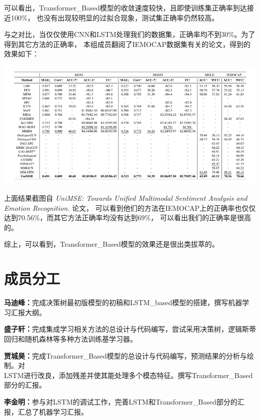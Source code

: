 \documentclass[11pt]{article}
\begin{document}
            可以看出，Transformer\_Based模型的收敛速度较快，且即使训练集正确率到达接近100\%，
            也没有出现较明显的过拟合现象，测试集正确率仍然较高。
            
            与之对比，当仅仅使用CNN和LSTM处理我们的数据集，正确率均不到30\%。为了得到其它方法的正确率，
            本组成员翻阅了IEMOCAP数据集有关的论文，得到的效果如下：

            \begin{center}
                \includegraphics[scale=0.9]{graph/result7.png}
            \end{center}

            上面结果截图自\textit{ UniMSE: Towards Unified Multimodal Sentiment Analysis and Emotion Recognition. }论文，
            可以看到他们的方法在IEMOCAP上的正确率也仅仅达到70.56\%，而其它方法正确率均没有达到69\%，
            可以看出我们的正确率是很高的。
            
            综上，可以看到，Transformer\_Based模型的效果还是很出类拔萃的。

    \section{成员分工}
    \textbf{马迪峰：}完成决策树最初版模型的初稿和LSTM\_based模型的搭建，撰写机器学习汇报大纲。

    \textbf{盛子轩：}完成集成学习相关方法的总设计与代码编写，尝试采用决策树，逻辑斯蒂回归和随机森林等多种方法训练基学习器。

    \textbf{贾城昊：}完成Transformer\_Based模型的总设计与代码编写，预测结果的分析与绘制。对\\LSTM进行改良，添加残差并使其能处理多个模态特征。撰写Transformer\_Based部分的汇报。

    \textbf{李金明：}参与对LSTM的调试工作，完善LSTM和Transformer\_Based部分的汇报，汇总了机器学习汇报。
\end{document}

